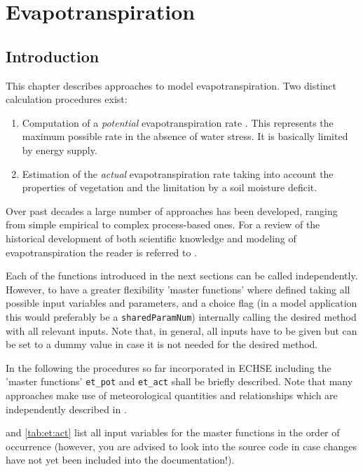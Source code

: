 \chapter{Evapotranspiration} \label{chap:et}
\renewcommand{\tabdir}{chapters/part_processes/evapotranspiration/tab}
\renewcommand{\figdir}{chapters/part_processes/evapotranspiration/fig}

\section{Introduction} \label{sec:et:intro}

This chapter describes approaches to model evapotranspiration. Two distinct calculation procedures exist:
\begin{enumerate}
  \item Computation of a \emph{potential} evapotranspiration rate \etPot. This represents the maximum possible rate in the absence of water stress. It is basically limited by energy supply.
  \item Estimation of the \emph{actual} evapotranspiration rate \etReal{} taking into account the properties of vegetation and the limitation by a soil moisture deficit.
\end{enumerate}

Over past decades a large number of approaches has been developed, ranging from simple empirical to complex process-based ones. For a review of the historical development of both scientific knowledge and modeling of evapotranspiration the reader is referred to \cite{Shuttleworth2007}.

Each of the functions introduced in the next sections can be called independently. However, to have a greater flexibility 'master functions' where defined taking all possible input variables and parameters, and a choice flag (in a model application this would preferably be a \verb!sharedParamNum!) internally calling the desired method with all relevant inputs. Note that, in general, all inputs have to be given but can be set to a dummy value in case it is not needed for the desired method.

In the following the procedures so far incorporated in ECHSE including the 'master functions' \verb!et_pot! and \verb!et_act! shall be briefly described. Note that many approaches make use of meteorological quantities and relationships which are independently described in .

 and \ref{tab:et:act} list all input variables for the master functions in the order of occurrence (however, you are advised to look into the source code in case changes have not yet been included into the documentation!).

